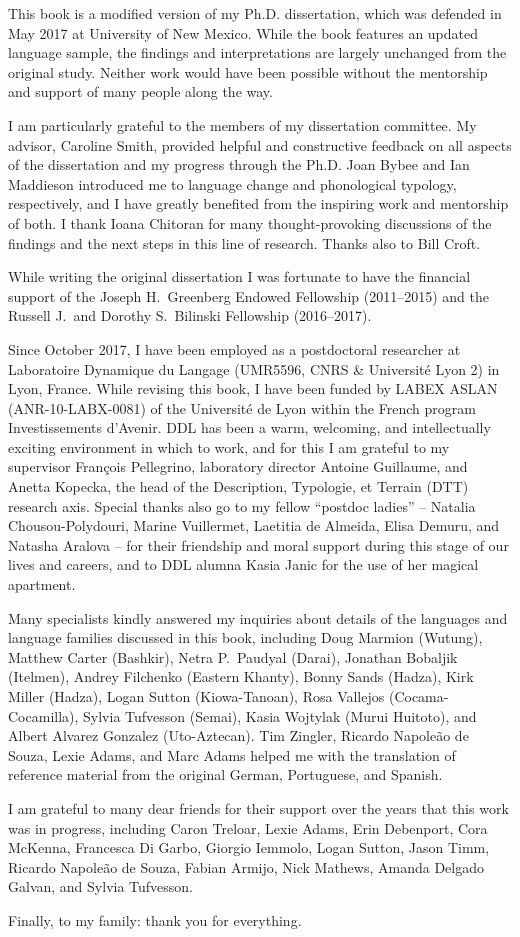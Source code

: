 \addchap{\lsAcknowledgementTitle} 

This book is a modified version of my Ph.D. dissertation, which was defended in May 2017 at University of New Mexico. While the book features an updated language sample, the findings and interpretations are largely unchanged from the original study. Neither work would have been possible without the mentorship and support of many people along the way.

I am particularly grateful to the members of my dissertation committee. My advisor, Caroline Smith, provided helpful and constructive feedback on all aspects of the dissertation and my progress through the Ph.D. Joan Bybee and Ian Maddieson introduced me to language change and phonological typology, respectively, and I have greatly benefited from the inspiring work and mentorship of both. I thank Ioana Chitoran for many thought-provoking discussions of the findings and the next steps in this line of research. Thanks also to Bill Croft.

While writing the original dissertation I was fortunate to have the financial support of the Joseph H.\ Greenberg Endowed Fellowship (2011--2015) and the Russell J.\ and Dorothy S.\ Bilinski Fellowship (2016--2017).

Since October 2017, I have been employed as a postdoctoral researcher at Laboratoire Dynamique du Langage (UMR5596, CNRS \& Université Lyon 2) in Lyon, France. While revising this book, I have been funded by LABEX ASLAN (ANR-10-LABX-0081) of the Université de Lyon within the French program Investissements d’Avenir. DDL has been a warm, welcoming, and intellectually exciting environment in which to work, and for this I am grateful to my supervisor François Pellegrino, laboratory director Antoine Guillaume, and Anetta Kopecka, the head of the Description, Typologie, et Terrain (DTT) research axis. Special thanks also go to my fellow ``postdoc ladies'' -- Natalia Chousou-Polydouri, Marine Vuillermet, Laetitia de Almeida, Elisa Demuru, and Natasha Aralova -- for their friendship and moral support during this stage of our lives and careers, and to DDL alumna Kasia Janic for the use of her magical apartment.

Many specialists kindly answered my inquiries about details of the languages and language families discussed in this book, including Doug Marmion (Wutung), Matthew Carter (Bashkir), Netra P.\ Paudyal (Darai), Jonathan Bobaljik (Itelmen), Andrey Filchenko (Eastern Khanty), Bonny Sands (Hadza), Kirk Miller (Hadza), Logan Sutton (Kiowa-Tanoan), Rosa Vallejos (Cocama-Cocamilla), Sylvia Tufvesson (Semai), Kasia Wojtylak (Murui Huitoto), and Albert Alvarez Gonzalez (Uto-Aztecan). Tim Zingler, Ricardo Napoleão de Souza, Lexie Adams, and Marc Adams helped me with the translation of reference material from the original German, Portuguese, and Spanish.

I am grateful to many dear friends for their support over the years that this work was in progress, including Caron Treloar, Lexie Adams, Erin Debenport, Cora McKenna, Francesca Di Garbo, Giorgio Iemmolo, Logan Sutton, Jason Timm, Ricardo Napoleão de Souza, Fabian Armijo, Nick Mathews, Amanda Delgado Galvan, and Sylvia Tufvesson. 

Finally, to my family: thank you for everything.
